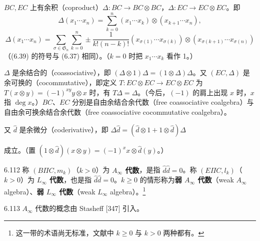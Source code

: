 $BC,EC$ 上有余积（coproduct）$\Delta\colon BC\to BC\otimes BC$，$\Delta\colon EC\to EC\otimes EC$。即
\begin{equation}
  \Delta(x_1\cdots x_n)=\sum_{k=0}^{n}(x_1\cdots x_k)\otimes(x_{k+1}\cdots x_n), \tag{6.38}
\end{equation}
\begin{equation}
  \Delta(x_1\cdots x_n)=\sum_{\sigma\in\mathfrak{S}_n}\sum_{k=0}^{n}\pm\frac{1}{k!(n-k)!}
  (x_{\sigma(1)}\cdots x_{\sigma(k)})\otimes(x_{\sigma(k+1)}\cdots x_{\sigma(n)}) \tag{6.39}
\end{equation}
（(6.39) 的符号与 (6.37) 相同）。（$k=0$ 时把 $x_1\cdots x_k$ 看作 1。）


$\Delta$ 是余结合的（coassociative），即 $(\Delta\otimes1)\Delta=(1\otimes\Delta)\Delta$。又 $(EC,\Delta)$ 是余可换的（cocommutative），即定义 $T\colon EC\otimes EC\to EC\otimes EC$ 为 $T(x\otimes y)=(-1)^{xy}y\otimes x$ 时，有 $T\Delta=\Delta$。（今后，$(-1)$ 的肩上出现 $x$ 时，$x$ 指 $\deg x$。）$BC$、$EC$ 分别是自由余结合余代数（free coassociative coalgebra）与自由余可换余结合余代数（free coassociative cocommutative coalgebra）。

又 $\hat d$ 是余微分（coderivative），即 $\Delta\hat d=(\hat d\otimes1+1\otimes\hat d)\Delta$

成立。（置 $(1\otimes\hat d)(x\otimes y)=(-1)^xx\otimes\hat d(y)$。）

\begin{definition}{6.112}
  称 $(B\Pi C,m_k)$（$k>0$）为 \textbf{$A_{\infty}$ 代数}，是指 $\hat d\hat d=0$。称 $(E\Pi C,l_k)$（$k>0$）为 \textbf{$L_{\infty}$ 代数}，也是指 $\hat d\hat d=0$。$k\ge0$ 的情形称为\textbf{弱 $A_{\infty}$ 代数}（weak $A_{\infty}$ algebra）、\textbf{弱 $L_{\infty}$ 代数}（weak $L_{\infty}$ algebra）。\footnote{这一带的术语尚无标准，文献中 $k\ge0$ 与 $k>0$ 两种都有。}
\end{definition}

\begin{remark}{6.113}
  $A_{\infty}$ 代数的概念由 Stasheff [347] 引入。
\end{remark}


